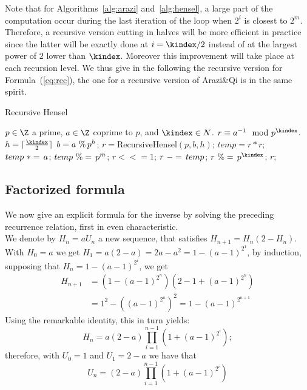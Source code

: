 \begin{remark}
Note that for Algorithms~\ref{alg:arazi} and~\ref{alg:hensel}, a large part of
the computation occur during the last iteration of the loop when $2^i$ is
closest to $2^m$. Therefore, a recursive version cutting in halves will be more
efficient in practice since the latter will be exactly done at $i=\kindex/2$
instead of at the largest power of $2$ lower than $\kindex$. Moreover this
improvement will take place at each recursion level. 
We thus give in the following the recursive version for Formula~(\ref{eq:rec}),
the one for a recursive version of Arazi\&Qi is in the same spirit. 

\begin{algorithm}[htbp]
\setcounter{prevalgorithm}{\thealgorithm}
\renewcommand\thealgorithm{\theprevalgorithm'}
\addtocounter{algorithm}{-1}
\caption{Recursive Hensel}
\label{alg:rec}
\begin{algorithmic}[1]
\REQUIRE $p\in \Z$ a prime, $a \in \Z$ coprime to $p$, and $\kindex \in N$.
\ENSURE $r \equiv a^{-1} \mod p^\kindex$.
\hfill{}
\STATE $h=\lceil\frac{\kindex}{2}\rceil$
\STATE\label{lin:modph} $b = a ~\%\, p^h$;\hfill{}
\STATE $r=$RecursiveHensel$(p,b,h)$;
\STATE $temp = r * r$;\hfill{} 
\STATE $temp ~*=\, a$;\hfill{} 
\STATE\label{lin:modpm} $temp ~\%=\, p^{m}$;\hfill{}
\STATE $r <<= 1$;\hfill{}
\STATE $r ~-=\, temp$;\hfill{}
\STATE $r \MODIN p^\kindex$;\hfill{}
\RETURN $r$;
\end{algorithmic}
\end{algorithm}
\end{remark}

\subsection{Factorized formula}
We now give an explicit formula for the inverse by solving the
preceding recurrence relation, first in even characteristic.\\

We denote by $H_n=aU_n$ a new sequence, that
satisfies $H_{n+1}=H_n(2-H_n)$.
With $H_0=a$ we get $H_1=a(2-a)=2a-a^2=1-(a-1)^{2^1}$,
by induction, supposing that $H_n=1-(a-1)^{2^i}$, we get
\begin{align*}
H_{n+1}&=\left(1-(a-1)^{2^n}\right)\left(2-1+(a-1)^{2^n}\right)\\
& = 1^2-\left((a-1)^{2^n}\right)^2 =1-(a-1)^{2^{n+1}}
\end{align*}
Using the remarkable identity, this in turn yields:
$$H_{n} = a(2-a)\prod_{i=1}^{n-1}\left(1+(a-1)^{2^i}\right);$$ therefore, with
$U_0=1$ and $U_1=2-a$ we have that  
\begin{equation}\label{eq:expl}
U_{n}= (2-a)\prod_{i=1}^{n-1}\left(1+(a-1)^{2^i}\right)
\end{equation}

